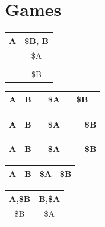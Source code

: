 \section{Games}
\begin{tabular}{|c|c|}
	\hline
	 A &\$B, B   \\ \hline
	 \hspace{6mm}  &\$A       \\ \hline
	   &    \\ \hline
    \multicolumn{1}{c|}{} & \$B \\ \hline
\end{tabular}
\begin{tabular}{|c|c|c|c|c|c|c|}
	\hline
	 A & B & \hspace{2mm} & \$A & \hspace{2mm} & \$B & \hspace{2mm} \\ \hline
\end{tabular}
\begin{tabular}{|c|c|c|c|c|c|c|}
	\hline
	 A & B & \hspace{2mm} & \$A & \hspace{2mm} & \hspace{2mm} & \$B\\ \hline
\end{tabular}
\begin{tabular}{|c|c|c|c|c|c|c|}
	\hline
	 A & B & \hspace{2mm} & \$A & \hspace{2mm} & \hspace{2mm} & \$B\\ \hline
\end{tabular}
\begin{tabular}{|c|c|c|c|}
	\hline
	 A & B & \$A & \$B\\ \hline
\end{tabular}
\begin{tabular}{|c|c|}
	\hline
	 A,\$B & B,\$A   \\ \hline
	 \$B & \$A   \\ \hline
\end{tabular}


